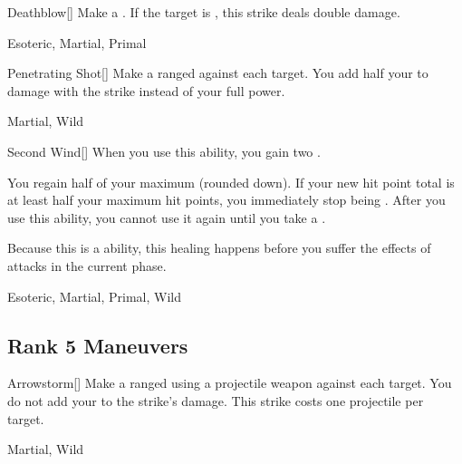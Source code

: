 \lowercase{\hypertarget{maneuver:Deathblow}{}}\label{maneuver:Deathblow}
\hypertarget{maneuver:Deathblow}{}
\begin{freeability}[Rank 4]{Deathblow}[]
Make a .
If the target is , this strike deals double damage.


 Esoteric, Martial, Primal
\end{freeability}
\vspace{0.25em}



\lowercase{\hypertarget{maneuver:Penetrating Shot}{}}\label{maneuver:Penetrating Shot}
\hypertarget{maneuver:Penetrating Shot}{}
\begin{freeability}[Rank 4]{Penetrating Shot}[]
Make a ranged  against each target.
You add half your  to damage with the strike instead of your full power.


 Martial, Wild
\end{freeability}
\vspace{0.25em}



\lowercase{\hypertarget{maneuver:Second Wind}{}}\label{maneuver:Second Wind}
\hypertarget{maneuver:Second Wind}{}
\begin{freeability}[Rank 4]{Second Wind}[]
When you use this ability, you gain two .

You regain half of your maximum  (rounded down).
If your new hit point total is at least half your maximum hit points, you immediately stop being .
After you use this ability, you cannot use it again until you take a .

Because this is a  ability, this healing happens before you suffer the effects of attacks in the current phase.


 Esoteric, Martial, Primal, Wild
\end{freeability}
\vspace{0.25em}


\subsection{Rank 5 Maneuvers}

\lowercase{\hypertarget{maneuver:Arrowstorm}{}}\label{maneuver:Arrowstorm}
\hypertarget{maneuver:Arrowstorm}{}
\begin{freeability}[Rank 5]{Arrowstorm}[]
Make a ranged  using a projectile weapon against each target.
You do not add your  to the strike's damage.
This strike costs one projectile per target.


 Martial, Wild
\end{freeability}
\vspace{0.25em}



